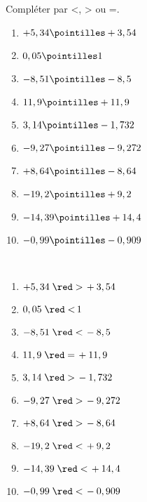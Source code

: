 \begin{exercice}
    Compléter par <, > ou =.
    {\baselineskip=7mm
    \begin{multicols}{2}
      \begin{enumerate}
         \item $+5,34 \pointilles +3,54$
         \item $0,05 \pointilles 1$
         \item $-8,51 \pointilles -8,5$
         \item $11,9 \pointilles +11,9$
         \item $3,14 \pointilles -1,732$
         \item $-9,27 \pointilles -9,272$
         \item $+8,64 \pointilles -8,64$
         \item $-19,2 \pointilles +9,2$
         \item $-14,39 \pointilles +14,4$
         \item $-0,99 \pointilles -0,909$
      \end{enumerate}
   \end{multicols}
   }
   
 \end{exercice}
 
 \begin{corrige}
    \ \\ [-7mm]
    {\baselineskip=7mm
    \begin{multicols}{2}
      \begin{enumerate}
         \item $+5,34 \; {\red >} \, +3,54$
         \item $0,05 \; {\red <} \, 1$
         \item $-8,51 \; {\red <} \, -8,5$
         \item $11,9 \; {\red =} \, +11,9$
         \item $3,14 \; {\red >} \, -1,732$
         \item $-9,27 \; {\red >} \, -9,272$
         \item $+8,64 \; {\red >} \, -8,64$
         \item $-19,2 \; {\red <} \, +9,2$
         \item $-14,39 \; {\red <} \, +14,4$
         \item $-0,99 \; {\red <} \, -0,909$
      \end{enumerate}
   \end{multicols}      
   }
 \end{corrige}